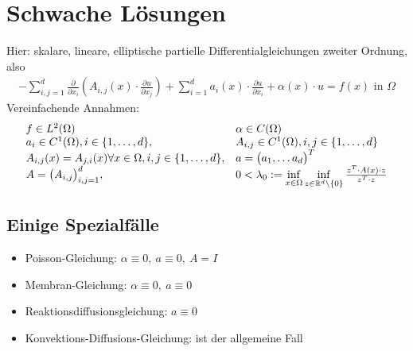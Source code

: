 \section{Schwache Lösungen} %
Hier: skalare, lineare, elliptische partielle Differentialgleichungen zweiter Ordnung, also
\begin{align*}
-\sum\limits_{i,j=1}^d\frac{\partial}{\partial x_i}\left(A_{i,j}(x)\cdot\frac{\partial u}{\partial x_j}\right)+\sum\limits_{i=1}^d a_i(x)\cdot\frac{\partial u}{\partial x_i}+\alpha(x)\cdot u=f(x)\text{ in }\Omega
\end{align*}
Vereinfachende Annahmen:
\begin{align*}
\begin{array}{ll}
	f\in L^2(\Omega)&\alpha \in C(\Omega)\\
	a_i\in C^1(\Omega),i\in\lbrace1,\ldots,d\rbrace, & A_{i,j}\in C^1(\Omega), i,j\in\lbrace1,\ldots,d\rbrace\\
	A_{i,j}(x)=A_{j,i}(x)\forall x\in\Omega, i,j\in\lbrace1,\ldots,d\rbrace, & a=\big(a_1,\ldots a_d\big)^T\\
	A=\big(A_{i,j}\big)^d_{i,j=1},& 0<\lambda_0:=\inf\limits_{x\in\Omega}\inf\limits_{z\in\mathbb{R}^d\setminus\lbrace0\rbrace}\frac{z^T\cdot A(x)\cdot z}{z^T\cdot z}
\end{array}
\end{align*}

\subsection*{Einige Spezialfälle}
\begin{itemize}
\item Poisson-Gleichung: $\alpha\equiv 0,~a\equiv0,~A=I$
\item Membran-Gleichung: $\alpha\equiv0,~a\equiv 0$
\item Reaktionsdiffusionsgleichung: $a\equiv 0$
\item Konvektions-Diffusions-Gleichung: ist der allgemeine Fall
\end{itemize}

